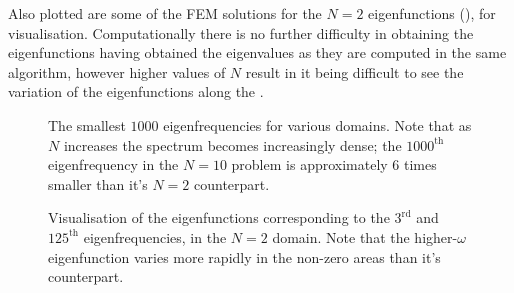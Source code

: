 Also plotted are some of the FEM solutions for the $N=2$ eigenfunctions (), for visualisation.
Computationally there is no further difficulty in obtaining the eigenfunctions having obtained the eigenvalues as they are computed in the same algorithm, however higher values of $N$ result in it being difficult to see the variation of the eigenfunctions along the .
\begin{figure}[h!]
	\centering
	\quad
	\quad
	\caption{The smallest $1000$ eigenfrequencies for various domains. Note that as $N$ increases the spectrum becomes increasingly dense; the $1000^{\mathrm{th}}$ eigenfrequency in the $N=10$ problem is approximately $6$ times smaller than it's $N=2$ counterpart.  \label{fig:NumericalSpectra}}
\end{figure}
\begin{figure}[h!]
	\centering
	\quad
	\caption{Visualisation of the eigenfunctions corresponding to the $3^{\mathrm{rd}}$ and  $125^{\mathrm{th}}$ eigenfrequencies, in the $N=2$ domain. Note that the higher-$\omega$ eigenfunction varies more rapidly in the non-zero areas than it's counterpart. \label{fig:NumericalFunctions}}
\end{figure}
